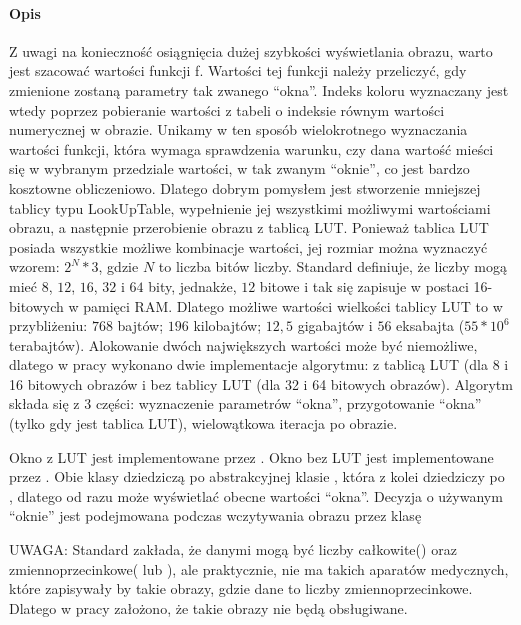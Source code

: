 \paragraph{Opis}
\par
Z uwagi na konieczność osiągnięcia dużej szybkości wyświetlania obrazu, warto jest szacować wartości funkcji f.
Wartości tej funkcji należy przeliczyć, gdy zmienione zostaną parametry tak zwanego \enquote{okna}.
Indeks koloru wyznaczany jest wtedy poprzez pobieranie wartości z tabeli o indeksie równym wartości numerycznej w obrazie.
Unikamy w ten sposób wielokrotnego wyznaczania wartości funkcji, która wymaga sprawdzenia warunku, czy dana wartość mieści się w wybranym przedziale wartości, w tak zwanym \enquote{oknie}, co jest bardzo kosztowne obliczeniowo.
Dlatego dobrym pomysłem jest stworzenie mniejszej tablicy typu LookUpTable, wypełnienie jej wszystkimi możliwymi wartościami obrazu, a następnie przerobienie obrazu z tablicą LUT.
Ponieważ tablica LUT posiada wszystkie możliwe kombinacje wartości, jej rozmiar można wyznaczyć wzorem: $2^N*3$, gdzie $N$ to liczba bitów liczby.
Standard \DICOM definiuje, że liczby mogą mieć $8$, $12$, $16$, $32$ i $64$ bity, jednakże, $12$ bitowe i tak się zapisuje w postaci 16-bitowych w pamięci RAM.
Dlatego możliwe wartości wielkości tablicy LUT to w przybliżeniu: $768$ bajtów; $196$ kilobajtów; $12,5$ gigabajtów i $56$ eksabajta ($55*10^{6}$ terabajtów).
Alokowanie dwóch największych wartości może być niemożliwe, dlatego w pracy wykonano dwie implementacje algorytmu: z tablicą LUT (dla 8 i 16 bitowych obrazów i bez tablicy LUT (dla 32 i 64 bitowych obrazów).
Algorytm składa się z 3 części: wyznaczenie parametrów \enquote{okna}, przygotowanie \enquote{okna} (tylko gdy jest tablica LUT), wielowątkowa iteracja po obrazie.
\par
Okno z LUT jest implementowane przez .
Okno bez LUT jest implementowane przez .
Obie klasy dziedziczą po abstrakcyjnej klasie , która z kolei dziedziczy po , dlatego od razu może wyświetlać obecne wartości \enquote{okna}.
Decyzja o używanym \enquote{oknie} jest podejmowana podczas wczytywania obrazu przez klasę 
\par
UWAGA: Standard \DICOM zakłada, że danymi mogą być liczby całkowite() oraz zmiennoprzecinkowe( lub ), ale praktycznie, nie ma takich aparatów medycznych, które zapisywały by takie obrazy, gdzie dane to liczby zmiennoprzecinkowe.
Dlatego w pracy założono, że takie obrazy nie będą obsługiwane.


